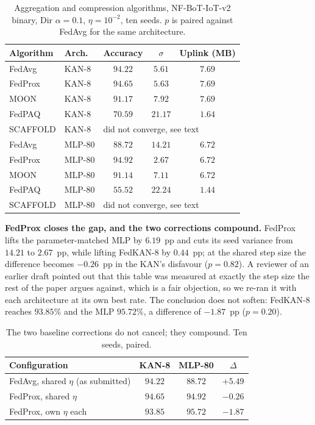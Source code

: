 \begin{table}[t]
\caption{Aggregation and compression algorithms, NF-BoT-IoT-v2 binary, Dir $\alpha=0.1$,
$\eta=10^{-2}$, ten seeds. $p$ is paired against FedAvg for the same architecture.}
\label{tab:algos}
\centering
\footnotesize
\begin{tabular}{@{}llccc@{}}
\toprule
Algorithm & Arch. & Accuracy & $\sigma$ & Uplink (MB) \\
\midrule
FedAvg   & KAN-8 & $94.22$ & $5.61$ & $7.69$ \\
FedProx  & KAN-8 & $94.65$ & $5.63$ & $7.69$ \\
MOON     & KAN-8 & $91.17$ & $7.92$ & $7.69$ \\
FedPAQ   & KAN-8 & $70.59$ & $21.17$ & $1.64$ \\
SCAFFOLD & KAN-8 & \multicolumn{3}{l}{did not converge, see text} \\
\midrule
FedAvg   & MLP-80 & $88.72$ & $14.21$ & $6.72$ \\
FedProx  & MLP-80 & $\mathbf{94.92}$ & $\mathbf{2.67}$ & $6.72$ \\
MOON     & MLP-80 & $91.14$ & $7.11$ & $6.72$ \\
FedPAQ   & MLP-80 & $55.52$ & $22.24$ & $1.44$ \\
SCAFFOLD & MLP-80 & \multicolumn{3}{l}{did not converge, see text} \\
\bottomrule
\end{tabular}
\end{table}

\textbf{FedProx closes the gap, and the two corrections compound.} FedProx lifts the
parameter-matched MLP by $6.19$~pp and cuts its seed variance from $14.21$ to $2.67$~pp, while
lifting FedKAN-8 by $0.44$~pp; at the shared step size the difference becomes $-0.26$~pp in the
KAN's disfavour ($p=0.82$). A reviewer of an earlier draft pointed out that this table was
measured at exactly the step size the rest of the paper argues against, which is a fair
objection, so we re-ran it with each architecture at its own best rate. The conclusion does not
soften: FedKAN-8 reaches $93.85\%$ and the MLP $95.72\%$, a difference of $-1.87$~pp
($p=0.20$).

\begin{table}[t]
\caption{The two baseline corrections do not cancel; they compound. Ten seeds, paired.}
\label{tab:compound}
\centering
\footnotesize
\begin{tabular}{@{}lccc@{}}
\toprule
Configuration & KAN-8 & MLP-80 & $\Delta$ \\
\midrule
FedAvg, shared $\eta$ (as submitted) & $94.22$ & $88.72$ & $+5.49$ \\
FedProx, shared $\eta$               & $94.65$ & $94.92$ & $-0.26$ \\
FedProx, own $\eta$ each             & $93.85$ & $\mathbf{95.72}$ & $\mathbf{-1.87}$ \\
\bottomrule
\end{tabular}
\end{table}

